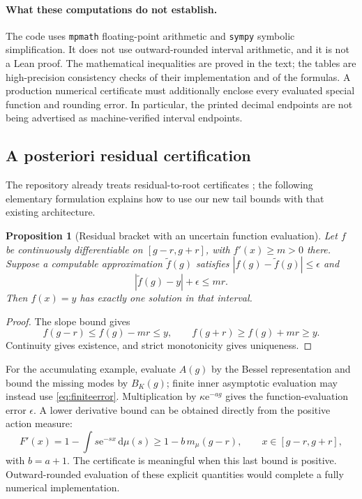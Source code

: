 \documentclass[11pt,a4paper]{article}
\newtheorem{proposition}[theorem]{Proposition}
\theoremstyle{definition}
\theoremstyle{remark}
\newcommand{\dd}{\,\mathrm d}
\newcommand{\e}{\mathrm e}
\newcommand{\code}[1]{\nolinkurl{#1}}
\numberwithin{equation}{section}
\begin{document}
\paragraph{What these computations do not establish.}
The code uses \code{mpmath} floating-point arithmetic and \code{sympy} symbolic simplification. It does not use outward-rounded interval arithmetic, and it is not a Lean proof. The mathematical inequalities are proved in the text; the tables are high-precision consistency checks of their implementation and of the formulas. A production numerical certificate must additionally enclose every evaluated special function and rounding error. In particular, the printed decimal endpoints are not being advertised as machine-verified interval endpoints.

\subsection{A posteriori residual certification}
The repository already treats residual-to-root certificates \cite{repo-main}; the following elementary formulation explains how to use our new tail bounds with that existing architecture.

\begin{proposition}[Residual bracket with an uncertain function evaluation]\label{prop:residual}
Let $f$ be continuously differentiable on $[g-r,g+r]$, with $f'(x)\ge m>0$ there. Suppose a computable approximation $\widetilde f(g)$ satisfies $|f(g)-\widetilde f(g)|\le\epsilon$ and
\[
 |\widetilde f(g)-y|+\epsilon\le mr.
\]
Then $f(x)=y$ has exactly one solution in that interval.
\end{proposition}
\begin{proof}
The slope bound gives
\[
 f(g-r)\le f(g)-mr\le y,
 \qquad f(g+r)\ge f(g)+mr\ge y.
\]
Continuity gives existence, and strict monotonicity gives uniqueness.
\end{proof}

For the accumulating example, evaluate $A(g)$ by the Bessel representation and bound the missing modes by $B_K(g)$; finite inner asymptotic evaluation may instead use \eqref{eq:finiteerror}. Multiplication by $\kappa\e^{-ag}$ gives the function-evaluation error $\epsilon$. A lower derivative bound can be obtained directly from the positive action measure:
\[
 F'(x)=1-\int s\e^{-sx}\dd\mu(s)
 \ge1-b\,m_\mu(g-r),\qquad x\in[g-r,g+r],
\]
with $b=a+1$. The certificate is meaningful when this last bound is positive. Outward-rounded evaluation of these explicit quantities would complete a fully numerical implementation.
\end{document}
